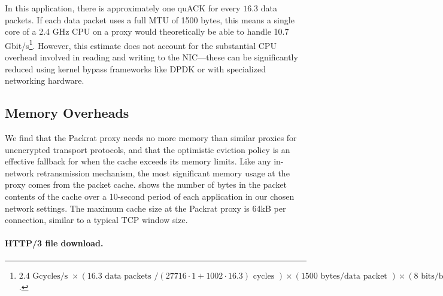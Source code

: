 

In this application, there is approximately one quACK for every $16.3$ data
packets. If each data packet uses a full MTU of 1500 bytes, this means a single
core of a 2.4 GHz CPU on a proxy would theoretically be able to handle 10.7
Gbit/s\footnote{ $2.4\text{ Gcycles/s }
\times(16.3 \text{ data packets } / (27716\cdot1 + 1002\cdot16.3) \text{ cycles })
\times (1500 \text{ bytes/data packet })
\times (8 \text{ bits/byte })
= 10.7 \text{ Gbit/s}$.
}. However, this estimate does not account for the substantial CPU overhead
involved in reading and writing to the NIC---these can be significantly reduced
using kernel bypass frameworks like DPDK or with specialized networking
hardware.



\subsection{Memory Overheads}



We find that the Packrat proxy needs no more memory
than similar proxies for unencrypted transport protocols, and that the optimistic
eviction policy is an effective fallback for when the cache exceeds its memory limits.
Like any in-network retransmission mechanism,
the most significant memory usage at the proxy comes from the packet
cache.  shows the number of bytes in the packet contents of
the cache over a 10-second period of each application in our chosen
network settings. The maximum cache size
at the Packrat proxy is 64kB per connection, similar to a typical TCP window size.

\paragraph{HTTP/3 file download.}

